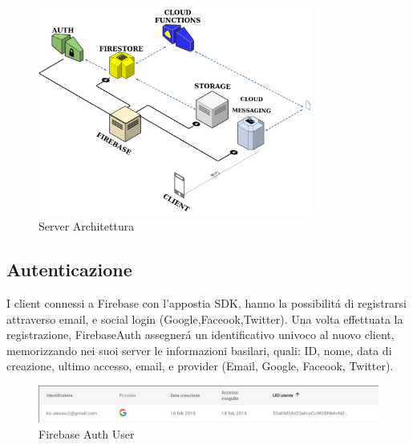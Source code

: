 \begin{figure}[!hb]
  \centering
  \includegraphics[width=0.8\textwidth]{immagini/server_arch.png}
  \caption{Server Architettura}\label{fig:Architettura Server}
\end{figure}

\subsection{Autenticazione}
I client connessi a Firebase con l'appostia SDK, hanno la possibilit\'a di registrarsi attraverso email, e social login (Google,Faceook,Twitter). Una volta effettuata la registrazione, FirebaseAuth assegner\'a un identificativo univoco al nuovo client, memorizzando nei suoi server le informazioni basilari, quali: ID, nome, data di creazione, ultimo accesso, email, e provider (Email, Google, Faceook, Twitter).
\begin{figure}[!h]
  \centering
  \includegraphics[width=1\textwidth]{immagini/firebase_auth_user.png}
  \caption{Firebase Auth User}\label{fig:Firebase User}
\end{figure}

